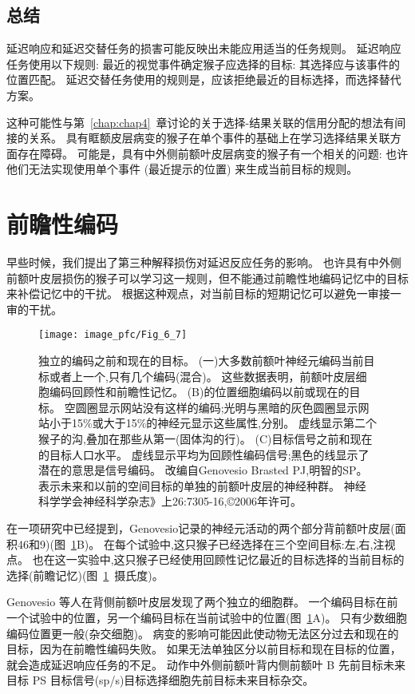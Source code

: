 \subsection{总结}

延迟响应和延迟交替任务的损害可能反映出未能应用适当的任务规则。
延迟响应任务使用以下规则: 最近的视觉事件确定猴子应选择的目标: 
其选择应与该事件的位置匹配。
延迟交替任务使用的规则是，应该拒绝最近的目标选择，而选择替代方案。


这种可能性与第~\ref{chap:chap4}~章讨论的关于选择-结果关联的信用分配的想法有间接的关系。
具有眶额皮层病变的猴子在单个事件的基础上在学习选择结果关联方面存在障碍。
可能是，具有中外侧前额叶皮层病变的猴子有一个相关的问题: 
也许他们无法实现使用单个事件 (最近提示的位置) 来生成当前目标的规则。



\section{前瞻性编码}

早些时候，我们提出了第三种解释损伤对延迟反应任务的影响。
也许具有中外侧前额叶皮层损伤的猴子可以学习这一规则，但不能通过前瞻性地编码记忆中的目标来补偿记忆中的干扰。
根据这种观点，对当前目标的短期记忆可以避免一审接一审的干扰。


\begin{figure}
	\centering
	\texttt{[image: image\_pfc/Fig\_6\_7]}
	\caption{独立的编码之前和现在的目标。
		(一)大多数前额叶神经元编码当前目标或者上一个,只有几个编码(混合)。
		这些数据表明，前额叶皮层细胞编码回顾性和前瞻性记忆。
		(B)的位置细胞编码以前或现在的目标。
		空圆圈显示网站没有这样的编码;光明与黑暗的灰色圆圈显示网站小于15\%或大于15\%的神经元显示这些属性,分别。
		虚线显示第二个猴子的沟,叠加在那些从第一(固体沟的行)。
		(C)目标信号之前和现在的目标人口水平。
		虚线显示平均为回顾性编码信号;黑色的线显示了潜在的意思是信号编码。
		改编自Genovesio Brasted PJ,明智的SP。
		表示未来和以前的空间目标的单独的前额叶皮层的神经种群。
		神经科学学会神经科学杂志》上26:7305-16,©2006年许可。}
	\label{fig:6_7}
\end{figure}


在一项研究中已经提到，Genovesio\cite{genovesio2006representation}记录的神经元活动的两个部分背前额叶皮层(面积46和9)(图~\ref{fig:6_7}B)。
在每个试验中,这只猴子已经选择在三个空间目标:左,右,注视点。
也在这一实验中,这只猴子已经使用回顾性记忆最近的目标选择的当前目标的选择(前瞻记忆)(图~\ref{fig:6_7}~摄氏度)。


Genovesio 等人在背侧前额叶皮层发现了两个独立的细胞群。
一个编码目标在前一个试验中的位置，另一个编码目标在当前试验中的位置(图~\ref{fig:6_7}A)。
只有少数细胞编码位置更一般(杂交细胞)。
病变的影响可能因此使动物无法区分过去和现在的目标，因为在前瞻性编码失败。
如果无法单独区分以前目标和现在目标的位置，就会造成延迟响应任务的不足。
动作中外侧前额叶背内侧前额叶 B 先前目标未来目标 PS 目标信号(sp/s)目标选择细胞先前目标未来目标杂交。



